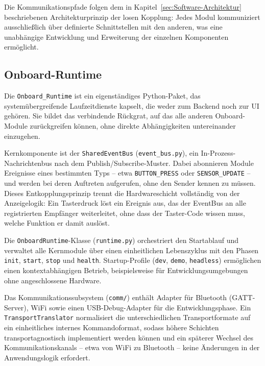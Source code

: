 Die Kommunikationspfade folgen dem in Kapitel~\ref{sec:Software-Architektur} beschriebenen
Architekturprinzip der losen Kopplung: Jedes Modul kommuniziert ausschließlich
über definierte Schnittstellen mit den anderen, was eine unabhängige Entwicklung
und Erweiterung der einzelnen Komponenten ermöglicht.

\subsection{Onboard-Runtime}
\label{subsec:onboardRuntime}

Die \texttt{Onboard\_Runtime} ist ein eigenständiges Python-Paket, das
systemübergreifende Laufzeitdienste kapselt, die weder zum Backend noch zur UI
gehören.
Sie bildet das verbindende Rückgrat, auf das alle anderen Onboard-Module
zurückgreifen können, ohne direkte Abhängigkeiten untereinander einzugehen.

Kernkomponente ist der \texttt{SharedEventBus} (\texttt{event\_bus.py}),
ein In-Prozess-Nachrichtenbus nach dem Publish/Subscribe-Muster.
Dabei abonnieren Module Ereignisse eines bestimmten Typs -- etwa
\texttt{BUTTON\_PRESS} oder \texttt{SENSOR\_UPDATE} -- und werden bei deren
Auftreten aufgerufen, ohne den Sender kennen zu müssen.
Dieses Entkopplungsprinzip trennt die Hardwareschicht vollständig von der
Anzeigelogik: Ein Tasterdruck löst ein Ereignis aus, das der EventBus an
alle registrierten Empfänger weiterleitet, ohne dass der Taster-Code
wissen muss, welche Funktion er damit auslöst.

Die \texttt{OnboardRuntime}-Klasse (\texttt{runtime.py}) orchestriert den
Startablauf und verwaltet alle Kernmodule über einen einheitlichen Lebenszyklus
mit den Phasen \texttt{init}, \texttt{start}, \texttt{stop} und \texttt{health}.
Startup-Profile (\texttt{dev}, \texttt{demo}, \texttt{headless}) ermöglichen
einen kontextabhängigen Betrieb, beispielsweise für Entwicklungsumgebungen ohne
angeschlossene Hardware.

Das Kommunikationssubsystem (\texttt{comm/}) enthält Adapter für Bluetooth
(GATT-Server), WiFi sowie einen USB-Debug-Adapter für die Entwicklungsphase.
Ein \texttt{TransportTranslator} normalisiert die unterschiedlichen
Transportformate auf ein einheitliches internes Kommandoformat, sodass höhere
Schichten transportagnostisch implementiert werden können und ein späterer
Wechsel des Kommunikationskanals -- etwa von WiFi zu Bluetooth -- keine
Änderungen in der Anwendungslogik erfordert.

